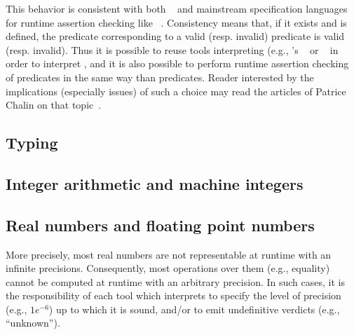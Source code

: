 
This behavior is consistent with both \acsl~\cite{acsl} and mainstream
specification languages for runtime assertion checking like
\jml~\cite{jml}. Consistency means that, if it exists and is defined, the \eacsl
predicate corresponding to a valid (resp. invalid) \acsl predicate is valid
(resp. invalid). Thus it is possible to reuse tools interpreting \acsl (e.g.,
\framac's \Eva~\cite{eva} or \Wp~\cite{wp} in order to interpret \eacsl, and
it is also possible to perform runtime assertion checking of \eacsl predicates
in the same way than \jml predicates. Reader interested by the implications
(especially issues) of such a choice may read the articles of Patrice
Chalin on that topic~\cite{chalin05,chalin07}.


\subsection{Typing}\label{sec:typing}
\nodiff


\subsection{Integer arithmetic and machine integers}
\nodiff


\subsection{Real numbers and floating point numbers}
\label{sec:reals}


More precisely, most real numbers are not representable at runtime with an
infinite precisions. Consequently, most operations over them (e.g., equality)
cannot be computed at runtime with an arbitrary precision. In such cases, it is
the responsibility of each tool which interprets \eacsl to specify the
level of precision (e.g., $1e^{-6}$) up to which it is sound, and/or to emit
undefinitive verdicts (e.g., ``unknown'').

